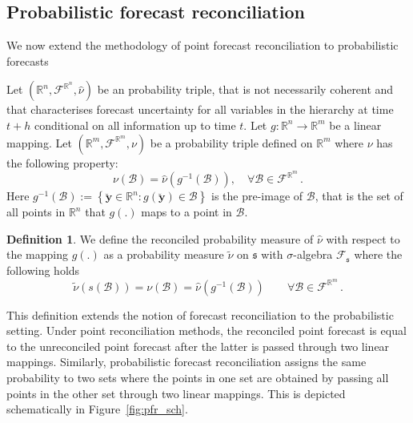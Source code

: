 \documentclass[a4paper, 11pt]{article}
\theoremstyle{theo}
\theoremstyle{definition}
\newtheorem{definition}{Definition}[section]
\begin{document}
\subsection{Probabilistic forecast reconciliation}

We now extend the methodology of point forecast reconciliation to probabilistic forecasts


  Let $(\mathbb{R}^n, \mathscr{F}^{\mathbb{R}^n}, \hat{\nu})$ be an probability triple, that is not necessarily coherent and that characterises forecast uncertainty for all variables in the hierarchy at time $t+h$ conditional on all information up to time $t$.  Let $g:\mathbb{R}^n \rightarrow \mathbb{R}^m $ be a linear mapping.  Let $(\mathbb{R}^m, \mathscr{F}^{\mathbb{R}^m}, \nu)$ be a probability triple defined on $\mathbb{R}^m$ where $\nu$ has the following property:
  \begin{equation}
  \nu(\mathcal{B}) = \hat{\nu}(g^{-1}(\mathcal{B})), \quad \forall \mathcal{B} \in \mathscr{F}^{\mathbb{R}^m}\,.
  \end{equation}
  Here $g^{-1}(\mathcal{B}):=\left\{\breve{\bm{y}}\in \mathbb{R}^n:g(\breve{\bm{y}})\in \mathcal{B} \right\}$ is the pre-image of $\mathcal{B}$, that is the set of all points in $\mathbb{R}^n$ that $g(.)$ maps to a point in $\mathcal{B}$.
  \begin{definition} \label{def:reconprob}
  We define the reconciled probability measure of $\hat{\nu}$ with respect to the mapping $g(.)$ as a probability measure $\tilde{\nu}$ on $\mathfrak{s}$ with $\sigma$-algebra $\mathscr{F}_\mathfrak{s}$ where the following holds
  \begin{equation}
  \tilde{\nu}(s(\mathcal{B})) = \nu(\mathcal{B})= \hat{\nu}(g^{-1}(\mathcal{B})) \qquad \forall \mathcal{B} \in \mathscr{F}^{\mathbb{R}^m}\,.
  \end{equation}
\end{definition}

This definition extends the notion of forecast reconciliation to the probabilistic setting.   Under point reconciliation methods, the reconciled point forecast is equal to the unreconciled point forecast after the latter is passed through two linear mappings. Similarly, probabilistic forecast reconciliation assigns the same probability to two sets where the points in one set are obtained by passing all points in the other set through two linear mappings.  This is depicted schematically in Figure~\ref{fig:pfr_sch}.
\end{document}
